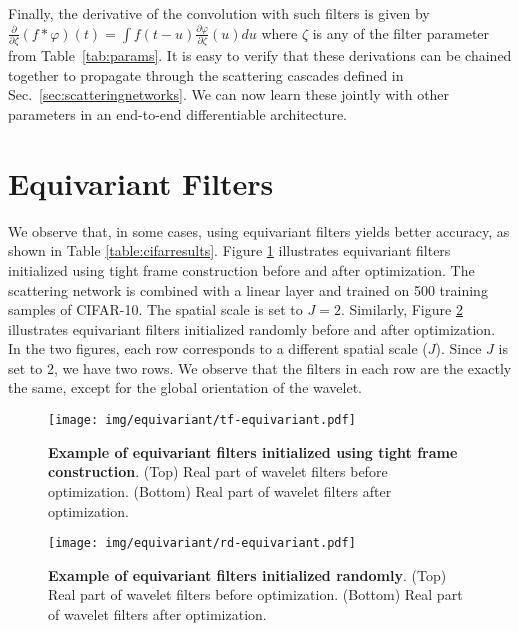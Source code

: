 \documentclass[10pt,twocolumn,letterpaper]{article}
\begin{document}
Finally, the derivative of the convolution with such filters is given by $\frac{\partial}{\partial \zeta}(f*\varphi)(t) = \int f(t-u) \frac{\partial \varphi}{\partial \zeta} (u) du$ where $\zeta$ is any of the filter parameter from Table~\ref{tab:params}. It is easy to verify that these derivations can be chained together to propagate through the scattering cascades defined in Sec.~\ref{sec:scatteringnetworks}.  We can now learn these jointly with other parameters in an end-to-end differentiable architecture.












\section{Equivariant Filters}
\label{appendix:equivariant}
We observe that, in some cases, using equivariant filters yields better accuracy, as shown in Table \ref{table:cifarresults}.  Figure \ref{fig:equivarianttf} illustrates equivariant filters initialized using tight frame construction before and after optimization. The scattering network is combined with a linear layer and trained on 500 training samples of CIFAR-10. The spatial scale is set to $J=2$. Similarly, Figure \ref{fig:equivariantrd} illustrates equivariant filters initialized randomly before and after optimization.  In the two figures, each row corresponds to a different spatial scale ($J$). Since $J$ is set to 2, we have two rows. We observe that the filters in each row are the exactly the same, except for the global orientation of the wavelet.
\vspace{-10pt}
\begin{figure}[!ht]
    \centering
    \texttt{[image: img/equivariant/tf-equivariant.pdf]}
        \vspace{-20pt}
    \caption{\textbf{Example of equivariant filters initialized using tight frame construction}. (Top) Real part of wavelet filters before optimization. (Bottom) Real part of wavelet filters after optimization.}
    \label{fig:equivarianttf}

\end{figure}
\begin{figure}[!ht]
    \centering
    \texttt{[image: img/equivariant/rd-equivariant.pdf]}
    \vspace{-20pt}
    \caption{\textbf{Example of equivariant filters initialized randomly}. (Top) Real part of wavelet filters before optimization.  (Bottom) Real part of wavelet filters after optimization.}
    \label{fig:equivariantrd}
\vspace{-10pt}
\end{figure}
\end{document}
